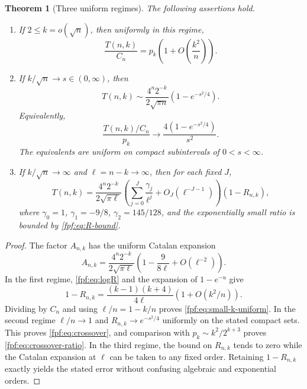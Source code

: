 \documentclass[11pt]{article}
\numberwithin{equation}{section}
\newtheorem{theorem}{Theorem}[section]
\theoremstyle{definition}
\begin{document}
\begin{theorem}[Three uniform regimes]\label{fpf:thm:crossover}
The following assertions hold.
\begin{enumerate}[label=(\roman*),leftmargin=2em]
\item If $2\le k=o(\sqrt n)$, then uniformly in this regime,
\begin{equation}\label{fpf:eq:small-k-uniform}
 \frac{T(n,k)}{C_n}=p_k\left(1+O\left(\frac{k^2}{n}\right)\right).
\end{equation}
\item If $k/\sqrt n\to s\in(0,\infty)$, then
\begin{equation}\label{fpf:eq:crossover}
 T(n,k)\sim\frac{4^n2^{-k}}{2\sqrt{\pi n}}
                  \left(1-e^{-s^2/4}\right).
\end{equation}
Equivalently,
\begin{equation}\label{fpf:eq:crossover-ratio}
 \frac{T(n,k)/C_n}{p_k}\longrightarrow
 \frac{4(1-e^{-s^2/4})}{s^2}.
\end{equation}
The equivalents are uniform on compact subintervals of $0<s<\infty$.
\item If $k/\sqrt n\to\infty$ and $\ell=n-k\to\infty$, then for each fixed $J$,
\begin{equation}\label{fpf:eq:large-k-uniform}
 T(n,k)=\frac{4^n2^{-k}}{2\sqrt{\pi\ell}}
 \left(\sum_{j=0}^J\frac{\gamma_j}{\ell^j}
                    +O_J(\ell^{-J-1})\right)(1-R_{n,k}),
\end{equation}
where $\gamma_0=1$, $\gamma_1=-9/8$, $\gamma_2=145/128$, and the
exponentially small ratio is bounded by \eqref{fpf:eq:R-bound}.
\end{enumerate}
\end{theorem}
\begin{proof}
The factor $A_{n,k}$ has the uniform Catalan expansion
\[
 A_{n,k}=\frac{4^n2^{-k}}{2\sqrt{\pi\ell}}
             \left(1-\frac9{8\ell}+O(\ell^{-2})\right).
\]
In the first regime, \eqref{fpf:eq:logR} and the expansion of $1-e^{-u}$ give
\[
 1-R_{n,k}=\frac{(k-1)(k+4)}{4\ell}
                \left(1+O(k^2/n)\right).
\]
Dividing by $C_n$ and using $\ell/n=1-k/n$ proves
\eqref{fpf:eq:small-k-uniform}. In the second regime $\ell/n\to1$ and
$R_{n,k}\to e^{-s^2/4}$ uniformly on the stated compact sets. This proves
\eqref{fpf:eq:crossover}, and comparison with $p_k\sim k^2/2^{k+3}$ proves
\eqref{fpf:eq:crossover-ratio}. In the third regime, the bound on $R_{n,k}$
tends to zero while the Catalan expansion at $\ell$ can be taken to any
fixed order. Retaining $1-R_{n,k}$ exactly yields the stated error without
confusing algebraic and exponential orders.
\end{proof}
\end{document}

